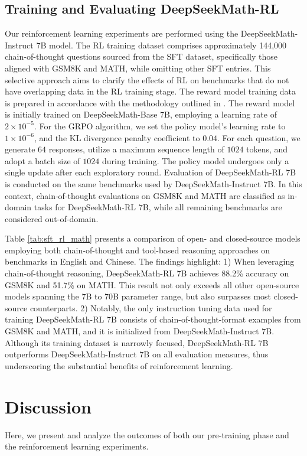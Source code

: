 \begin{itemize}[topsep=0pt]
\begin{itemize}[topsep=0pt]
\subsection{Training and Evaluating DeepSeekMath-RL}

Our reinforcement learning experiments are performed using the DeepSeekMath-Instruct 7B model. The RL training dataset comprises approximately 144,000 chain-of-thought questions sourced from the SFT dataset, specifically those aligned with GSM8K and MATH, while omitting other SFT entries. This selective approach aims to clarify the effects of RL on benchmarks that do not have overlapping data in the RL training stage. The reward model training data is prepared in accordance with the methodology outlined in \citep{wang2023math}. The reward model is initially trained on DeepSeekMath-Base 7B, employing a learning rate of $2 \times 10^{-5}$. For the GRPO algorithm, we set the policy model’s learning rate to $1 \times 10^{-6}$, and the KL divergence penalty coefficient to $0.04$. For each question, we generate $64$ responses, utilize a maximum sequence length of $1024$ tokens, and adopt a batch size of $1024$ during training. The policy model undergoes only a single update after each exploratory round. Evaluation of DeepSeekMath-RL 7B is conducted on the same benchmarks used by DeepSeekMath-Instruct 7B. In this context, chain-of-thought evaluations on GSM8K and MATH are classified as in-domain tasks for DeepSeekMath-RL 7B, while all remaining benchmarks are considered out-of-domain.

Table \ref{tab:sft_rl_math} presents a comparison of open- and closed-source models employing both chain-of-thought and tool-based reasoning approaches on benchmarks in English and Chinese. The findings highlight: 1) When leveraging chain-of-thought reasoning, DeepSeekMath-RL 7B achieves 88.2\% accuracy on GSM8K and 51.7\% on MATH. This result not only exceeds all other open-source models spanning the 7B to 70B parameter range, but also surpasses most closed-source counterparts. 2) Notably, the only instruction tuning data used for training DeepSeekMath-RL 7B consists of chain-of-thought-format examples from GSM8K and MATH, and it is initialized from DeepSeekMath-Instruct 7B. Although its training dataset is narrowly focused, DeepSeekMath-RL 7B outperforms DeepSeekMath-Instruct 7B on all evaluation measures, thus underscoring the substantial benefits of reinforcement learning.

\section{Discussion}
Here, we present and analyze the outcomes of both our pre-training phase and the reinforcement learning experiments.


\end{itemize}
\end{itemize}
